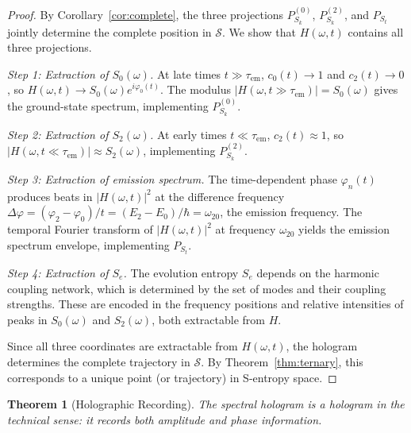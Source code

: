 \documentclass[11pt,twocolumn,a4paper]{article}
\newtheorem{theorem}{Theorem}[section]
\theoremstyle{definition}
\theoremstyle{remark}
\newcommand{\Sk}{S_k}
\newcommand{\St}{S_t}
\newcommand{\Se}{S_e}
\newcommand{\Sspace}{\mathcal{S}}
\begin{document}
\begin{proof}
By Corollary~\ref{cor:complete}, the three projections $P_{\Sk}^{(0)}$, $P_{\Sk}^{(2)}$, and $P_{\St}$ jointly determine the complete position in $\Sspace$. We show that $H(\omega, t)$ contains all three projections.

\emph{Step 1: Extraction of $S_0(\omega)$.} At late times $t \gg \tau_{\mathrm{em}}$, $c_0(t) \to 1$ and $c_2(t) \to 0$, so $H(\omega, t) \to S_0(\omega) e^{i\varphi_0(t)}$. The modulus $|H(\omega, t \gg \tau_{\mathrm{em}})| = S_0(\omega)$ gives the ground-state spectrum, implementing $P_{\Sk}^{(0)}$.

\emph{Step 2: Extraction of $S_2(\omega)$.} At early times $t \ll \tau_{\mathrm{em}}$, $c_2(t) \approx 1$, so $|H(\omega, t \ll \tau_{\mathrm{em}})| \approx S_2(\omega)$, implementing $P_{\Sk}^{(2)}$.

\emph{Step 3: Extraction of emission spectrum.} The time-dependent phase $\varphi_n(t)$ produces beats in $|H(\omega, t)|^2$ at the difference frequency $\Delta\varphi = (\varphi_2 - \varphi_0)/t = (E_2 - E_0)/\hbar = \omega_{20}$, the emission frequency. The temporal Fourier transform of $|H(\omega, t)|^2$ at frequency $\omega_{20}$ yields the emission spectrum envelope, implementing $P_{\St}$.

\emph{Step 4: Extraction of $\Se$.} The evolution entropy $\Se$ depends on the harmonic coupling network, which is determined by the set of modes and their coupling strengths. These are encoded in the frequency positions and relative intensities of peaks in $S_0(\omega)$ and $S_2(\omega)$, both extractable from $H$.

Since all three coordinates are extractable from $H(\omega, t)$, the hologram determines the complete trajectory in $\Sspace$. By Theorem~\ref{thm:ternary}, this corresponds to a unique point (or trajectory) in S-entropy space.
\end{proof}

\begin{theorem}[Holographic Recording]
\label{thm:holographic}
The spectral hologram is a hologram in the technical sense: it records both amplitude and phase information.
\end{theorem}
\end{document}

